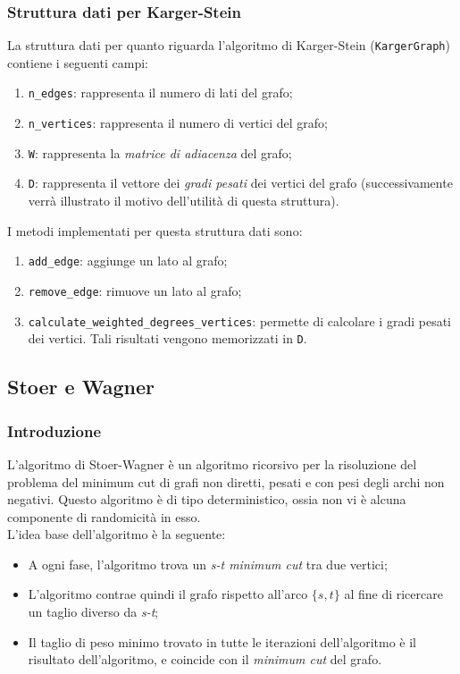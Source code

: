\subsubsection{Struttura dati per Karger-Stein}
La struttura dati per quanto riguarda l'algoritmo di Karger-Stein (\verb|KargerGraph|) contiene i seguenti campi:
\begin{enumerate}
  \item \verb|n_edges|: rappresenta il numero di lati del grafo;
  \item \verb|n_vertices|: rappresenta il numero di vertici del grafo;
  \item \verb|W|: rappresenta la \textit{matrice di adiacenza} del grafo;
  \item \verb|D|: rappresenta il vettore dei \textit{gradi pesati} dei vertici del grafo (successivamente verrà illustrato 
  il motivo dell'utilità di questa struttura).
\end{enumerate}

I metodi implementati per questa struttura dati sono:
\begin{enumerate}
  \item \verb|add_edge|: aggiunge un lato al grafo;
  \item \verb|remove_edge|: rimuove un lato al grafo;
  \item \verb|calculate_weighted_degrees_vertices|: permette di calcolare i gradi pesati dei vertici. Tali risultati vengono 
  memorizzati in \verb|D|.
\end{enumerate}

\subsection{Stoer e Wagner}

\subsubsection{Introduzione}

L'algoritmo di Stoer-Wagner è un algoritmo ricorsivo per la risoluzione del problema del minimum cut di grafi non diretti, pesati e con pesi degli archi non negativi. Questo algoritmo è di tipo deterministico, ossia non vi è alcuna componente di randomicità in esso. \\
L'idea base dell'algoritmo è la seguente: 
\begin{itemize}
  \item A ogni fase, l'algoritmo trova un \textit{s-t minimum cut} tra due vertici;
  \item L'algoritmo contrae quindi il grafo rispetto all'arco $\{s,t\}$ al fine di ricercare un taglio diverso da \textit{s-t};
  \item Il taglio di peso minimo trovato in tutte le iterazioni dell'algoritmo è il risultato dell'algoritmo, e coincide con il \textit{minimum cut} del grafo.
\end{itemize}

